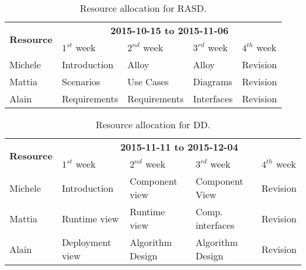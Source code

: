 \begin{table}[htb]
    \centering
    \begin{small}
    \begin{tabular}{| l | l | l | l | l |}
        \hline
        \multirow{2}{*}{\textbf{Resource}} & \multicolumn{4}{c|}{\textbf{2015-10-15 to 2015-11-06}} \\
        \cline{2-5}
        & $1^{st}$ week & $2^{nd}$ week & $3^{rd} $ week & $4^{th}$ week\\
        \hline
        Michele     & Introduction  & Alloy          & Alloy       & Revision    \\
        Mattia      & Scenarios     & Use Cases      & Diagrams    & Revision    \\
        Alain       & Requirements  & Requirements   & Interfaces  & Revision    \\
        \hline
    \end{tabular}
    \end{small}
    \caption{Resource allocation for RASD.}
    \label{tab:rasd-res-alloc}
\end{table}

\begin{table}
    \centering
    \begin{small}
    \begin{tabular}{| l | l | l | l | l |}
        \hline
        \multirow{2}{*}{\textbf{Resource}} & \multicolumn{4}{c|}{\textbf{2015-11-11 to 2015-12-04}} \\
        \cline{2-5}
        & $1^{st}$ week & $2^{nd}$ week & $3^{rd} $ week & $4^{th}$ week\\
        \hline
        Michele        & Introduction      & Component view     & Component View & Revision   \\
        Mattia         & Runtime view      & Runtime view       & Comp. interfaces & Revision   \\
        Alain          & Deployment view   & Algorithm Design   & Algorithm Design & Revision  \\
        \hline
    \end{tabular}
    \end{small}
    \caption{Resource allocation for DD.}
    \label{tab:dd-res-alloc}
\end{table}

